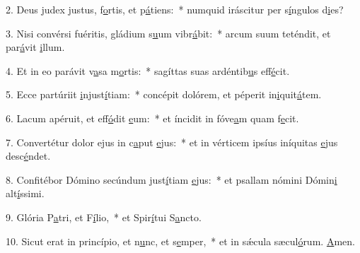 2. Deus judex justus, f\uline{o}rtis, et p\uline{á}tiens:~* numquid iráscitur per s\uline{í}ngulos d\uline{i}es?\par 
3. Nisi convérsi fuéritis, gládium s\uline{u}um vibr\uline{á}bit:~* arcum suum teténdit, et par\uline{á}vit \uline{i}llum.\par 
4. Et in eo parávit v\uline{a}sa m\uline{o}rtis:~* sagíttas suas ardéntib\uline{u}s eff\uline{é}cit.\par 
5. Ecce partúriit \uline{i}njust\uline{í}tiam:~* concépit dolórem, et péperit in\uline{i}quit\uline{á}tem.\par 
6. Lacum apéruit, et eff\uline{ó}dit \uline{e}um:~* et íncidit in fóve\uline{a}m quam f\uline{e}cit.\par 
7. Convertétur dolor ejus in c\uline{a}put \uline{e}jus:~* et in vérticem ipsíus iníquitas \uline{e}jus desc\uline{é}ndet.\par 
8. Confitébor Dómino secúndum just\uline{í}tiam \uline{e}jus:~* et psallam nómini Dómin\uline{i} alt\uline{í}ssimi.\par 
9. Glória P\uline{a}tri, et F\uline{í}lio,~* et Spir\uline{í}tui S\uline{a}ncto.\par 
10. Sicut erat in princípio, et n\uline{u}nc, et s\uline{e}mper,~* et in sǽcula sæcul\uline{ó}rum. \uline{A}men.\par 
